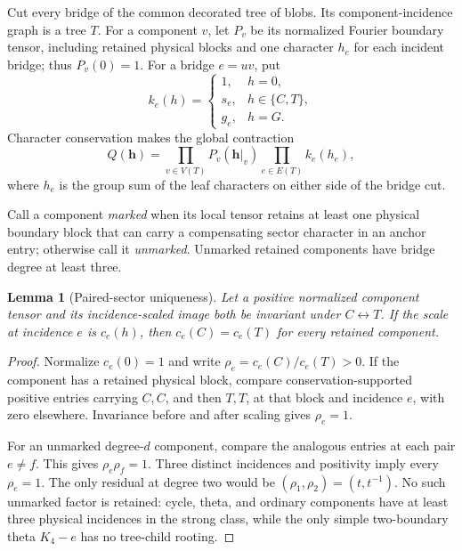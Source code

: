 \documentclass[11pt]{article}
\newtheorem{lemma}[theorem]{Lemma}
\theoremstyle{remark}
\newcommand{\1}{\mathbf 1}
\begin{document}
Cut every bridge of the common decorated tree of blobs.  Its
component-incidence graph is a tree \(T\).  For a component \(v\), let
\(P_v\) be its normalized Fourier boundary tensor, including retained physical
blocks and one character \(h_e\) for each incident bridge; thus \(P_v(0)=1\).
For a bridge \(e=uv\), put
\[
 k_e(h)=
 \begin{cases}
 1,&h=0,\\
 s_e,&h\in\{C,T\},\\
 g_e,&h=G.
 \end{cases}
\]
Character conservation makes the global contraction
\begin{equation}\label{eq:bridge-contraction}
 Q(\mathbf h)=
 \prod_{v\in V(T)}P_v(\mathbf h|_v)
 \prod_{e\in E(T)}k_e(h_e),
\end{equation}
where \(h_e\) is the group sum of the leaf characters on either side of the
bridge cut.

Call a component \emph{marked} when its local tensor retains at least one
physical boundary block that can carry a compensating sector character in an
anchor entry; otherwise call it \emph{unmarked}.  Unmarked retained components
have bridge degree at least three.

\begin{lemma}[Paired-sector uniqueness]\label{lem:paired-scale}
Let a positive normalized component tensor and its incidence-scaled image
both be invariant under \(C\leftrightarrow T\).  If the scale at incidence
\(e\) is \(c_e(h)\), then \(c_e(C)=c_e(T)\) for every retained component.
\end{lemma}

\begin{proof}
Normalize \(c_e(0)=1\) and write
\(\rho_e=c_e(C)/c_e(T)>0\).  If the component has a retained physical block,
compare conservation-supported positive entries carrying \(C,C\), and then
\(T,T\), at that block and incidence \(e\), with zero elsewhere.  Invariance
before and after scaling gives \(\rho_e=1\).

For an unmarked degree-\(d\) component, compare the analogous entries at
each pair \(e\ne f\).  This gives \(\rho_e\rho_f=1\).  Three distinct
incidences and positivity imply every \(\rho_e=1\).  The only residual at
degree two would be \((\rho_1,\rho_2)=(t,t^{-1})\).  No such unmarked factor
is retained: cycle, theta, and ordinary components have at least three
physical incidences in the strong class, while the only simple two-boundary
theta \(K_4-e\) has no tree-child rooting.
\end{proof}
\end{document}
